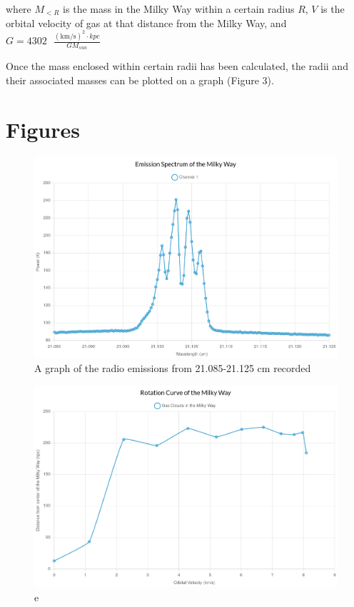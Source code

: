 \documentclass{article}
\begin{document}
where $M_{<R}$ is the mass in the Milky Way within a certain radius $R$, $V$ is the orbital velocity of gas at that distance from the Milky Way, and $G=4302\text{ }\frac{(\text{km/s})^2 \cdot kpc}{GM_{sun}}$

Once the mass enclosed within certain radii has been calculated, the radii and their associated masses can be plotted on a graph (Figure 3).

\section{Figures}
\begin{center}
    \begin{figure}[h!bt]
        \caption{
            A graph of the radio emissions from 21.085-21.125 cm recorded
            \smallskip
        }
        \includegraphics[scale=0.2]{emission-graph-lab9.jpg}
        \centering
    \end{figure}
    \begin{figure}[h!bt]
        \caption{
            e
            \smallskip
        }
        \includegraphics[scale=0.1]{rotation-curve-lab9.jpg}

\end{figure}
\end{center}
\end{document}
